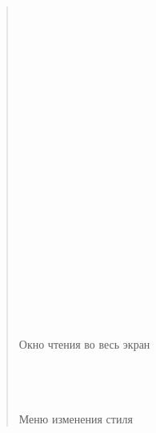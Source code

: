 \documentclass[letterpaper,10pt,russian]{sphinxmanual}
\begin{document}
\begin{quote}
\noindent{}

\sphinxAtStartPar
\\
\\
\\
\\
\\
\\
\\
\\
\\
\\
\\
\\
\\
\\
\\
\\
\\
\\
\\
\\
\\
Окно чтения во весь экран

\noindent{}

\sphinxAtStartPar
\\
\\
\\
Меню изменения стиля

\noindent{}
\end{quote}
\end{document}
